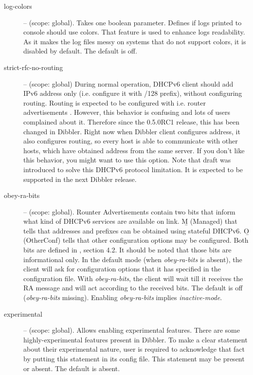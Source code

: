 \begin{description}
\item[log-colors] -- (scope: global). Takes one boolean parameter.
  Defines if logs printed to console should use colors. That feature
  is used to enhance logs readability.  As it makes the log files
  messy on systems that do not support colors, it is disabled by
  default. The default is off.

 \item[strict-rfc-no-routing] -- (scope: global) During normal
  operation, DHCPv6 client should add IPv6 address only
  (i.e. configure it with /128 prefix), without configuring routing.
  Routing is expected to be configured with i.e. router
  advertisements \cite{rfc4861}. However, this behavior is confusing
  and lots of users complained about it. Therefore since the 0.5.0RC1
  release, this has been changed in Dibbler. Right now when Dibbler
  client configures address, it also configures routing, so every host
  is able to communicate with other hosts, which have obtained address
  from the same server. If you don't like this behavior, you might
  want to use this option. Note that draft \cite{draft-route-option} was
  introduced to solve this DHCPv6 protocol limitation. It is expected
  to be supported in the next Dibbler release.

\item[obey-ra-bits] -- (scope: global). Rounter Advertisements contain
  two bits that inform what kind of DHCPv6 services are available on
  link. \b M (Managed) that tells that addresses and prefixes can be
  obtained using stateful DHCPv6. \b O (OtherConf) tells that other
  configuration options may be configured. Both bits are defined
  in \cite{rfc4861}, section 4.2. It should be noted that those bits
  are informational only. In the default mode
  (when \emph{obey-ra-bits} is absent), the client will ask for
  configuration options that it has specified in the configuration
  file. With \emph{obey-ra-bits}, the client will wait till it
  receives the RA message and will act according to the received
  bits. The default is off (\emph{obey-ra-bits}
  missing). Enabling \emph{obey-ra-bits} implies \emph{inactive-mode}.

\item[experimental] -- (scope: global). Allows enabling experimental
features. There are some highly-experimental features present in
Dibbler. To make a clear statement about their experimental nature,
user is required to acknowledge that fact by putting this statement in
its config file. This statement may be present or absent. The default
is absent.


\end{description}
